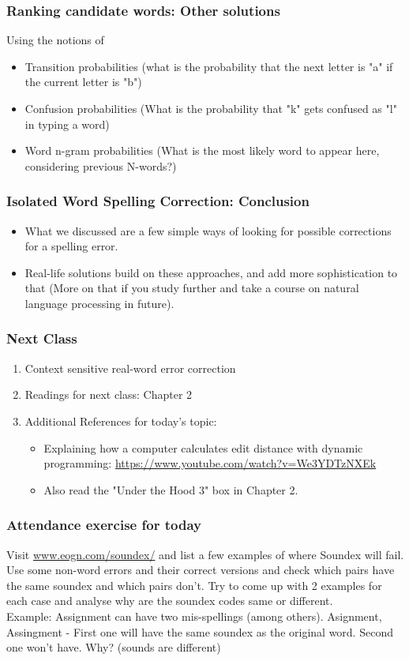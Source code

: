 \documentclass{beamer}
\begin{document}
\begin{frame}
\frametitle{Ranking candidate words: Other solutions}
Using the notions of 
\begin{itemize}
\item Transition probabilities (what is the probability that the next letter is "a" if the current letter is "b")
\item Confusion probabilities (What is the probability that "k" gets confused as "l" in typing a word)
\item Word n-gram probabilities (What is the most likely word to appear here, considering previous N-words?)
\end{itemize}
\end{frame}

\begin{frame}
\frametitle{Isolated Word Spelling Correction: Conclusion}
\begin{itemize}
\item What we discussed are a few simple ways of looking for possible corrections for a spelling error.
\item Real-life solutions build on these approaches, and add more sophistication to that (More on that if you study further and take a course on natural language processing in future).
\end{itemize}
\end{frame}

\begin{frame}
\frametitle{Next Class}
\begin{enumerate}
\item Context sensitive real-word error correction
\item Readings for next class: Chapter 2
\item Additional References for today's topic:
\begin{itemize}
\item Explaining how a computer calculates edit distance with dynamic programming: \url{https://www.youtube.com/watch?v=We3YDTzNXEk}
\item Also read the "Under the Hood 3" box in Chapter 2. 
\end{itemize}
\end{enumerate}
\end{frame}

\begin{frame}
\frametitle{Attendance exercise for today}
Visit \url{www.eogn.com/soundex/} and list a few examples of where Soundex will fail. Use some non-word errors and their correct versions and check which pairs have the same soundex and which pairs don't. Try to come up with 2 examples for each case and analyse why are the soundex codes same or different.
\\ Example: Assignment can have two mis-spellings (among others). Asignment, Assingment - First one will have the same soundex as the original word. Second one won't have. Why? (sounds are different)
\end{frame}
\end{document}
